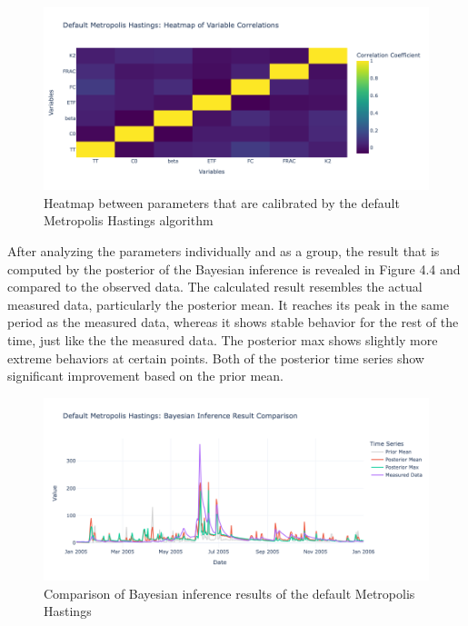 \begin{figure}
    \centering
    \includegraphics[width=1\textwidth]{figures/basic_mh/default_mh/default_mh_heatmap.png}
    \captionsetup{width=.8\textwidth}
    \caption{Heatmap between parameters that are calibrated by the default Metropolis Hastings algorithm}
    \label{fig:enter-label}
\end{figure}


After analyzing the parameters individually and as a group, the result that is computed by the posterior of the Bayesian inference is revealed in Figure 4.4 and compared to the observed data. The calculated result resembles the actual measured data, particularly the posterior mean. It reaches its peak in the same period as the measured data, whereas it shows stable behavior for the rest of the time, just like the the measured data. The posterior max shows slightly more extreme behaviors at certain points. Both of the posterior time series show significant improvement based on the prior mean. 


\begin{figure}
    \centering
    \includegraphics[width=1\textwidth]{figures/basic_mh/default_mh/default_mh_bayes.png}
    \captionsetup{width=.8\textwidth}
    \caption{Comparison of Bayesian inference results of the default Metropolis Hastings}
    \label{fig:enter-label}
\end{figure}

